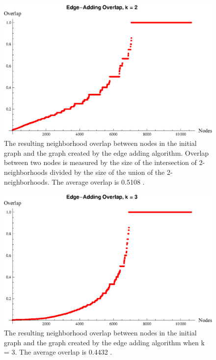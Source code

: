 \begin{figure}[htb]
\includegraphics[scale=1]{s40_edge_add_k_2_overlap.eps}
	\caption{The resulting neighborhood overlap between nodes in the initial graph and the graph created by the edge adding algorithm. Overlap between two nodes is measured by the size of the intersection of 2-neighborhoods divided by the size of the union of the 2-neighborhoods. The average overlap is 0.5108 . }
	\label{fig:edge-adding overlap k=2}
\end{figure}

\begin{figure}[htb]
\includegraphics[scale=1]{s40_edge_add_k_3_overlap.eps}
	\caption{The resulting neighborhood overlap between nodes in the initial graph and the graph created by the edge adding algorithm when k = 3. The average overlap is 0.4432 . }
	\label{fig:edge-adding overlap k=3}
\end{figure}

